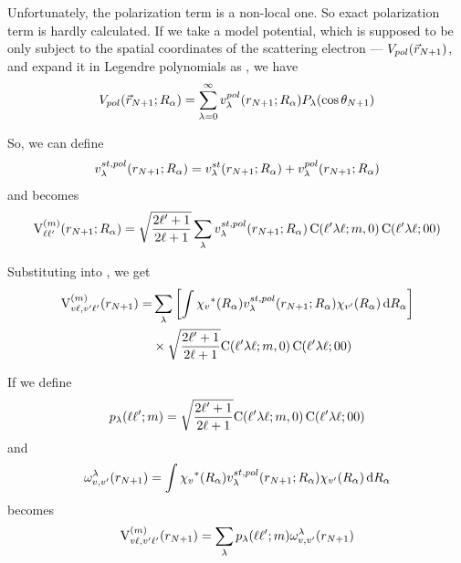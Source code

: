 \documentclass[aps,pra,groupedaddress,12pt,
               amsfonts,amssymb,
               preprint
    ]{revtex4}
\begin{document}
Unfortunately, the polarization term is a non-local one. So exact
polarization term is hardly calculated. If we take a model potential,
which is supposed to be only subject to the spatial coordinates of the
scattering electron --- $V_{pol}(\vec{r}_{N+1})$, and expand it in Legendre
polynomials as , we have
\begin{equation}
  \label{eq:vpolel}
  V_{pol}(\vec{r}_{N+1};R_\alpha) = \sum_{\lambda=0}^\infty v_\lambda^{pol}(r_{N+1};R_\alpha)P_\lambda(\cos\theta_{N+1})  
\end{equation}

So, we can define
\begin{equation}
  \label{eq:vstpol}
  v_\lambda^{st,pol}(r_{N+1};R_\alpha) = v_\lambda^{st}(r_{N+1};R_\alpha) + v_\lambda^{pol}(r_{N+1};R_\alpha)
\end{equation}
and  becomes
\begin{equation}
  \label{eq:mvsp}
  \mathrm{V}_{\ell\ell'}^{(m)}(r_{N+1};R_\alpha) = \sqrt{\dfrac{2\ell'+1}{2\ell+1}}
                        \sum_{\lambda}v_\lambda^{st,pol}(r_{N+1};R_\alpha)
                        \,\mathrm{C}(\ell'\lambda\ell;m,0)\,\mathrm{C}(\ell'\lambda\ell;00)
\end{equation}

Substituting  into , we get
\begin{equation}
  \label{eq:cvsp}
  \begin{split}
  \mathrm{V}_{v\ell,v'\ell'}^{(m)}(r_{N+1}) = &
  \sum_{\lambda}\left[\int\chi_{v}{}^*(R_\alpha)v_\lambda^{st,pol}(r_{N+1};R_\alpha)\chi_{v'}(R_\alpha)\,\mathrm{d}R_\alpha\right] \\
  &\times\sqrt{\dfrac{2\ell'+1}{2\ell+1}}\mathrm{C}(\ell'\lambda\ell;m,0)\,\mathrm{C}(\ell'\lambda\ell;00)
  \end{split}
\end{equation}

If we define
\begin{equation}
  \label{eq:glam}
  p_{\lambda}(\ell\ell';m) = \sqrt{\dfrac{2\ell'+1}{2\ell+1}}\mathrm{C}(\ell'\lambda\ell;m,0)\,\mathrm{C}(\ell'\lambda\ell;00)
\end{equation}
and
\begin{equation}
  \label{eq:clsp}
  \omega_{v,v'}^{\lambda}(r_{N+1}) = \int\chi_{v}{}^*(R_\alpha)v_\lambda^{st,pol}(r_{N+1};R_\alpha)\chi_{v'}(R_\alpha)\,\mathrm{d}R_\alpha
\end{equation}
 becomes 
\begin{equation}
  \label{eq:cvspa}
  \mathrm{V}_{v\ell,v'\ell'}^{(m)}(r_{N+1}) = \sum_{\lambda}p_{\lambda}(\ell\ell';m)\omega_{v,v'}^{\lambda}(r_{N+1})
\end{equation}
\end{document}
